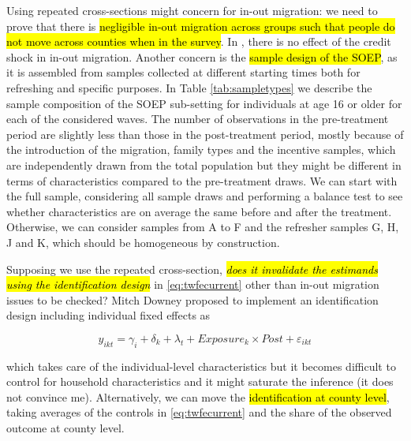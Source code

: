 \documentclass[11pt]{article}
\begin{document}
Using repeated cross-sections might concern for in-out migration: we need to prove that there is \hl{negligible in-out migration across groups such that people do not move across counties when in the survey}. In \citet{bib:huber2018}, there is no effect of the credit shock in in-out migration. Another concern is the \hl{sample design of the SOEP}, as it is assembled from samples collected at different starting times both for refreshing and specific purposes. In Table \ref{tab:sampletypes} we describe the sample composition of the SOEP sub-setting for individuals at age 16 or older for each of the considered waves. The number of observations in the pre-treatment period are slightly less than those in the post-treatment period, mostly because of the introduction of the migration, family types and the incentive samples, which are independently drawn from the total population but they might be different in terms of characteristics compared to the pre-treatment draws. We can start with the full sample, considering all sample draws and performing a balance test to see whether characteristics are on average the same before and after the treatment. Otherwise, we can consider samples from A to F and the refresher samples G, H, J and K, which should be homogeneous by construction.

Supposing we use the repeated cross-section, \hl{\textit{does it invalidate the estimands using the identification design}} in \eqref{eq:twfecurrent} other than in-out migration issues to be checked? Mitch Downey proposed to implement an identification design including individual fixed effects as

\begin{equation}
    y_{ikt} = \gamma_{i} + \delta_{k} + \lambda_{t} + Exposure_{k} \times Post + \varepsilon_{ikt}\label{eq:twfeindividual}
\end{equation}

which takes care of the individual-level characteristics but it becomes difficult to control for household characteristics and it might saturate the inference (it does not convince me). Alternatively, we can move the \hl{identification at county level}, taking averages of the controls in \eqref{eq:twfecurrent} and the share of the observed outcome at county level.\\
\end{document}
